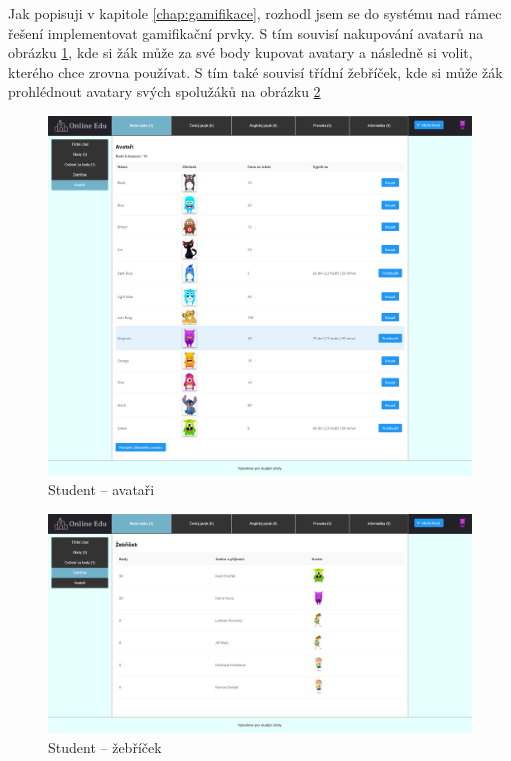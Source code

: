 \documentclass[twoside]{ctuthesis}
\theoremstyle{plain}
\theoremstyle{definition}
\theoremstyle{note}
\begin{document}
Jak popisuji v kapitole \ref{chap:gamifikace}, rozhodl jsem se do systému nad rámec řešení implementovat gamifikační prvky. S tím souvisí nakupování avatarů na obrázku \ref{ref:student-avatari}, kde si žák může za své body kupovat avatary a následně si volit, kterého chce zrovna používat. S tím také souvisí třídní žebříček, kde si může žák prohlédnout avatary svých spolužáků na obrázku \ref{ref:student-zebricek}
\begin{figure}[H]
    \caption{Student -- avataři}
    \label{ref:student-avatari}
    \centering
    \includegraphics[width=\textwidth]{images/app_screenshots/zak_seznam_avataru_vybrany_2}
\end{figure}
\begin{figure}[H]
    \caption{Student -- žebříček}
    \label{ref:student-zebricek}
    \centering
    \includegraphics[width=\textwidth]{images/app_screenshots/zak_zebricek}
\end{figure}
\end{document}
